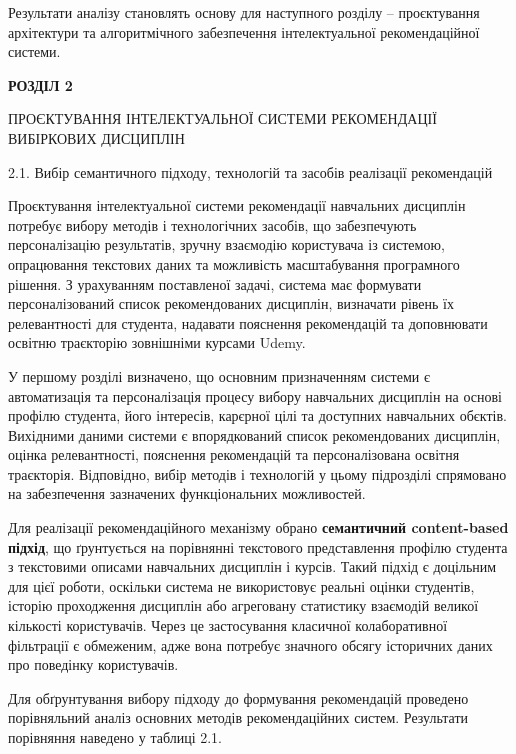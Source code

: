 \documentclass[
]{article}
\begin{document}
Результати аналізу становлять основу для наступного розділу --
проєктування архітектури та алгоритмічного забезпечення інтелектуальної
рекомендаційної системи.

\textbf{\hfill\break
}

\protect{}\label{_Toc230434085}{}\textbf{РОЗДІЛ 2}

\protect{}\label{_Toc230434086}{}ПРОЄКТУВАННЯ
ІНТЕЛЕКТУАЛЬНОЇ СИСТЕМИ РЕКОМЕНДАЦІЇ ВИБІРКОВИХ ДИСЦИПЛІН

\protect{}\label{_Toc230434087}{}2.1. Вибір семантичного
підходу, технологій та засобів реалізації рекомендацій

Проєктування інтелектуальної системи рекомендації навчальних дисциплін
потребує вибору методів і технологічних засобів, що забезпечують
персоналізацію результатів, зручну взаємодію користувача із системою,
опрацювання текстових даних та можливість масштабування програмного
рішення. З урахуванням поставленої задачі, система має формувати
персоналізований список рекомендованих дисциплін, визначати рівень їх
релевантності для студента, надавати пояснення рекомендацій та
доповнювати освітню траєкторію зовнішніми курсами Udemy.

У першому розділі визначено, що основним призначенням системи є
автоматизація та персоналізація процесу вибору навчальних дисциплін на
основі профілю студента, його інтересів, кар\textquotesingle єрної цілі
та доступних навчальних об\textquotesingle єктів. Вихідними даними
системи є впорядкований список рекомендованих дисциплін, оцінка
релевантності, пояснення рекомендацій та персоналізована освітня
траєкторія. Відповідно, вибір методів і технологій у цьому підрозділі
спрямовано на забезпечення зазначених функціональних можливостей.

Для реалізації рекомендаційного механізму обрано \textbf{семантичний
content-based підхід}, що ґрунтується на порівнянні текстового
представлення профілю студента з текстовими описами навчальних дисциплін
і курсів. Такий підхід є доцільним для цієї роботи, оскільки система не
використовує реальні оцінки студентів, історію проходження дисциплін або
агреговану статистику взаємодій великої кількості користувачів. Через це
застосування класичної колаборативної фільтрації є обмеженим, адже вона
потребує значного обсягу історичних даних про поведінку користувачів.

Для обґрунтування вибору підходу до формування рекомендацій проведено
порівняльний аналіз основних методів рекомендаційних систем. Результати
порівняння наведено у таблиці 2.1.
\end{document}
